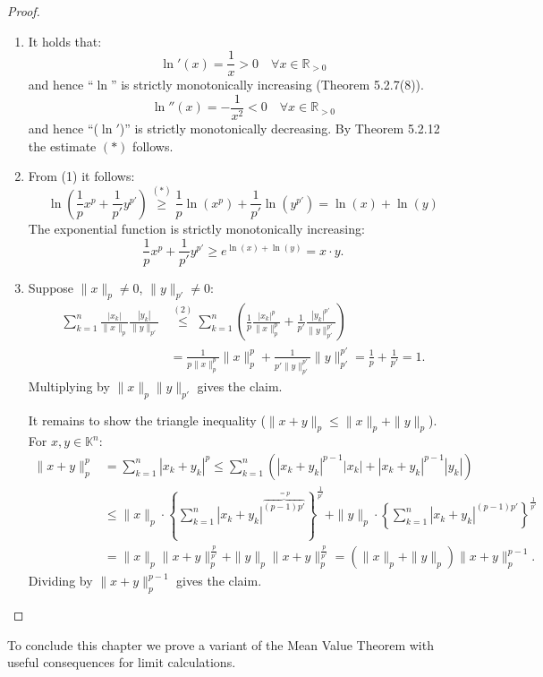 \documentclass[12pt]{article}
\begin{document}
\begin{proof}
\begin{enumerate}
\item It holds that:
\[
    \ln'(x) = \frac{1}{x} > 0 \quad \forall x \in \mathbb{R}_{>0}
\]
and hence ``$\ln$'' is strictly monotonically increasing (Theorem 5.2.7(8)).
\[
    \ln''(x) = -\frac{1}{x^2} < 0 \quad \forall x \in \mathbb{R}_{>0}
\]
and hence ``($\ln'$)'' is strictly monotonically decreasing. By Theorem 5.2.12 the estimate $(*)$ follows.

\item From (1) it follows:
\[
    \ln\!\left(\frac{1}{p}x^p + \frac{1}{p'}y^{p'}\right) \overset{(*)}{\geq} \frac{1}{p}\ln(x^p) + \frac{1}{p'}\ln(y^{p'}) = \ln(x) + \ln(y)
\]
The exponential function is strictly monotonically increasing:
\[
    \frac{1}{p}x^p + \frac{1}{p'}y^{p'} \geq e^{\ln(x)+\ln(y)} = x \cdot y.
\]

\item Suppose $\|x\|_p \neq 0$, $\|y\|_{p'} \neq 0$:
\begin{align*}
    \sum_{k=1}^{n} \frac{|x_k|}{\|x\|_p} \frac{|y_k|}{\|y\|_{p'}}
    &\overset{(2)}{\leq} \sum_{k=1}^{n} \left(\frac{1}{p}\frac{|x_k|^p}{\|x\|_p^p} + \frac{1}{p'}\frac{|y_k|^{p'}}{\|y\|_{p'}^{p'}}\right) \\
    &= \frac{1}{p\|x\|_p^p}\|x\|_p^p + \frac{1}{p'\|y\|_{p'}^{p'}}\|y\|_{p'}^{p'} = \frac{1}{p} + \frac{1}{p'} = 1.
\end{align*}
Multiplying by $\|x\|_p\|y\|_{p'}$ gives the claim.

It remains to show the triangle inequality ($\|x+y\|_p \leq \|x\|_p + \|y\|_p$). For $x, y \in \mathbb{K}^n$:
\begin{align*}
    \|x+y\|_p^p &= \sum_{k=1}^n |x_k+y_k|^p \leq \sum_{k=1}^n \left(|x_k+y_k|^{p-1}|x_k| + |x_k+y_k|^{p-1}|y_k|\right) \\
    &\leq \|x\|_p \cdot \left\{\sum_{k=1}^n |x_k+y_k|^{\overbrace{(p-1)p'}^{=p}}\right\}^{\frac{1}{p'}}
    + \|y\|_p \cdot \left\{\sum_{k=1}^n |x_k+y_k|^{(p-1)p'}\right\}^{\frac{1}{p'}} \\
    &= \|x\|_p\|x+y\|_p^{\frac{p}{p'}} + \|y\|_p\|x+y\|_p^{\frac{p}{p'}}
    = (\|x\|_p + \|y\|_p)\|x+y\|_p^{p-1}.
\end{align*}
Dividing by $\|x+y\|_p^{p-1}$ gives the claim.
\end{enumerate}
\end{proof}


To conclude this chapter we prove a variant of the Mean Value Theorem with useful consequences for limit calculations.
\end{document}

